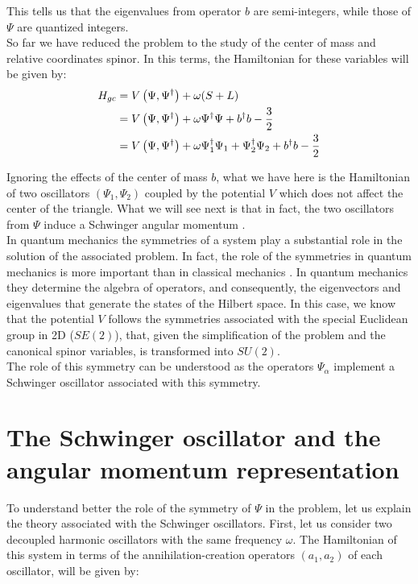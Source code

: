 This tells us that the eigenvalues from operator $b$ are semi-integers, while those of $\Psi$ are quantized integers.\\

So far we have reduced the problem to the study of the center of mass and relative coordinates spinor. In this terms, the Hamiltonian for these variables will be given by:\\

\begin{align*}
H_{gc} &= V\left( \Psi,\Psi^\dagger \right)+ \omega (S+L)\\
&= V\left( \Psi,\Psi^\dagger \right) + \omega{\Psi^\dagger\Psi + b^\dagger b -\frac{3}{2}}\\
&= V\left( \Psi,\Psi^\dagger \right) + \omega{\Psi_1^\dagger\Psi_1 +\Psi_2^\dagger\Psi_2+ b^\dagger b -\frac{3}{2}}
\end{align*}

Ignoring the effects of the center of mass $b$, what we have here is the Hamiltonian of two oscillators $(\Psi_1,\Psi_2)$ coupled by the potential $V$ which does not affect the center of the triangle. What we will see next is that in fact, the two oscillators from $\Psi$ induce a Schwinger angular momentum \cite{Schwinger}.\\

In quantum mechanics the symmetries of a system play a substantial role in the solution of the associated problem. In fact, the role of the symmetries in quantum mechanics is more important than in classical mechanics \cite{qfhebook}. In quantum mechanics they determine the algebra of operators, and consequently, the eigenvectors and eigenvalues that generate the states of the Hilbert space. In this case, we know that the potential $V$ follows the symmetries associated with the special Euclidean group in 2D ($SE(2)$), that, given the simplification of the problem and the canonical spinor variables, is transformed into $SU(2)$.\\

The role of this symmetry can be understood as the operators $\Psi_\alpha$ implement a Schwinger oscillator \cite{Schwinger} associated with this symmetry.\\

\section{The Schwinger oscillator and the angular momentum representation}
To understand better the role of the symmetry of $\Psi$ in the problem, let us explain the theory associated with the Schwinger oscillators. First, let us consider two decoupled harmonic oscillators with the same frequency $\omega$. The Hamiltonian of this system in terms of the annihilation-creation operators $(a_1,a_2)$ of each oscillator, will be given by:

